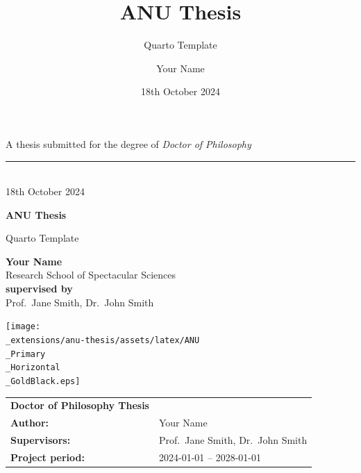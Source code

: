 \documentclass[
  a4paper,
  oneside,
  openany,
  12pt,
  onecolumn]{book}
\title{ANU Thesis}
\subtitle{Quarto Template}
\author{Your Name}
\date{18th October 2024}
\theoremstyle{plain}
\theoremstyle{definition}
\theoremstyle{remark}
\begin{document}
  \begin{frontmatter}
  \begin{titlepage}

  \begin{titlepage}
    \begin{flushright}%
      \vspace{50mm}
      {\small A thesis submitted for the degree of {\it Doctor of
  Philosophy}}
      \rule[1ex]{\textwidth}{1pt}\\
      {\fontsize{9}{0} 18th October 2024}\\
      \vspace{25mm}
      {\fontsize{40}{44}\bfseries ANU Thesis\par}
        \vspace{12mm}
    	\parbox{\textwidth}{
  	\begin{flushright}
  		\fontsize{28}{30} Quarto Template
  	\end{flushright}}
  	    \vfill
      {\fontsize{20}{0}\bfseries Your Name}\\
      \vspace{2mm}
      {\fontsize{8}{0} Research School of Spectacular Sciences}\\
      \vspace{35mm}
      {\fontsize{10}{0}\bfseries supervised by}\\
      Prof.~Jane Smith, Dr.~John Smith
      
      \vspace{2.0cm}
  		\texttt{[image: \\\_extensions/anu-thesis/assets/latex/ANU\\\_Primary\\\_Horizontal\\\_GoldBlack.eps]}\\
   \end{flushright}%

   \clearpage\thispagestyle{empty}
   \normalfont
   \vspace*{\fill}
   \noindent
   \begin{tabular}{lp{10cm}}
     {\bf Doctor of Philosophy Thesis} & \\[2mm]
     {\bf Author:} & Your Name\\[2mm]
     {\bf Supervisors:} & Prof.~Jane Smith, Dr.~John Smith\\[2mm]
     
     {\bf Project period:} & 2024-01-01 -- 2028-01-01 \\[2mm]
   \end{tabular}\\[2mm]


\end{titlepage}
\end{titlepage}
\end{frontmatter}
\end{document}

